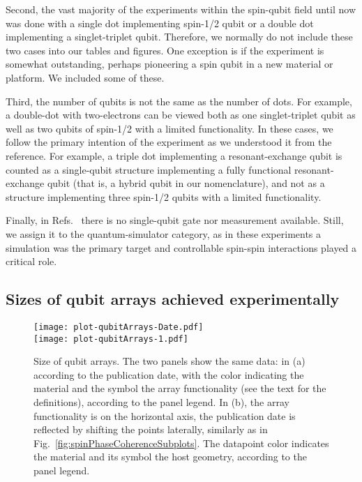 \documentclass[aps, prx, showpacs, twocolumn, superscriptaddress, notitlepage, longbibliography, floatfix, nofootinbib]{revtex4-2}
\begin{document}
Second, the vast majority of the experiments within the spin-qubit field until now was done with a single dot implementing spin-1/2 qubit or a double dot implementing a singlet-triplet qubit. Therefore, we normally do not include these two cases into our tables and figures. One exception is if the experiment is somewhat outstanding, perhaps pioneering a spin qubit in a new material or platform. We included some of these. 

Third, the number of qubits is not the same as the number of dots. For example, a double-dot with two-electrons can be viewed both as one singlet-triplet qubit as well as two qubits of spin-1/2 with a limited functionality. In these cases, we follow the primary intention of the experiment as we understood it from the reference. For example, a triple dot implementing a resonant-exchange qubit is counted as a single-qubit structure implementing a fully functional resonant-exchange qubit (that is, a hybrid qubit in our nomenclature), and not as a structure implementing three spin-1/2 qubits with a limited functionality.

Finally, in Refs.~\cite{van_diepen_quantum_2021,dehollain_nagaoka_2020} there is no single-qubit gate nor measurement available. Still, we assign it to the quantum-simulator category, as in these experiments a simulation was the primary target and controllable spin-spin interactions played a critical role.

\subsection{Sizes of qubit arrays achieved experimentally}


\begin{figure}[t!]
  \texttt{[image: plot-qubitArrays-Date.pdf]}\\ 
    \texttt{[image: plot-qubitArrays-1.pdf]}
  \caption{
  \label{fig:arraySize}
  Size of qubit arrays. The two panels show the same data: in (a) according to the publication date, with the color indicating the material and the symbol the array functionality (see the text for the definitions), according to the panel legend. In (b), the array functionality is on the horizontal axis, the publication date is reflected by shifting the points laterally, similarly as in Fig.~\ref{fig:spinPhaseCoherenceSubplots}. The datapoint color indicates the material and its symbol the host geometry, according to the panel legend.
  }
\end{figure}
\end{document}
